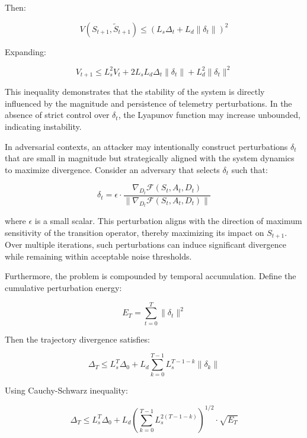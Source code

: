 Then:

\begin{equation}
V(S_{t+1}, \tilde{S}_{t+1}) \leq (L_s \Delta_t + L_d \|\delta_t\|)^2
\end{equation}

Expanding:

\begin{equation}
V_{t+1} \leq L_s^2 V_t + 2L_s L_d \Delta_t \|\delta_t\| + L_d^2 \|\delta_t\|^2
\end{equation}

This inequality demonstrates that the stability of the system is directly influenced by the magnitude and persistence of telemetry perturbations. In the absence of strict control over $\delta_t$, the Lyapunov function may increase unbounded, indicating instability.

In adversarial contexts, an attacker may intentionally construct perturbations $\delta_t$ that are small in magnitude but strategically aligned with the system dynamics to maximize divergence. Consider an adversary that selects $\delta_t$ such that:

\begin{equation}
\delta_t = \epsilon \cdot \frac{\nabla_{D_t} \mathcal{F}(S_t, A_t, D_t)}{\|\nabla_{D_t} \mathcal{F}(S_t, A_t, D_t)\|}
\end{equation}

where $\epsilon$ is a small scalar. This perturbation aligns with the direction of maximum sensitivity of the transition operator, thereby maximizing its impact on $S_{t+1}$. Over multiple iterations, such perturbations can induce significant divergence while remaining within acceptable noise thresholds.

Furthermore, the problem is compounded by temporal accumulation. Define the cumulative perturbation energy:

\begin{equation}
E_T = \sum_{t=0}^{T} \|\delta_t\|^2
\end{equation}

Then the trajectory divergence satisfies:

\begin{equation}
\Delta_T \leq L_s^T \Delta_0 + L_d \sum_{k=0}^{T-1} L_s^{T-1-k} \|\delta_k\|
\end{equation}

Using Cauchy-Schwarz inequality:

\begin{equation}
\Delta_T \leq L_s^T \Delta_0 + L_d \left( \sum_{k=0}^{T-1} L_s^{2(T-1-k)} \right)^{1/2} \cdot \sqrt{E_T}
\end{equation}

